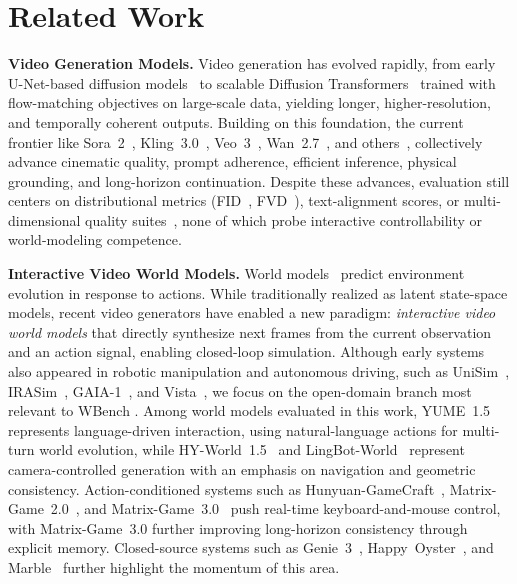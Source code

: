 \documentclass{llmxive}
\providecommand{\benchmark}{WBench }
\begin{document}
\section{Related Work}
\label{sec:related_work}

\textbf{Video Generation Models.}
Video generation has evolved rapidly, from early U-Net-based diffusion models~\cite{ho2020denoising,ho2022video,blattmann2023align} to scalable Diffusion Transformers~\cite{yang2024cogvideox,polyak2024moviegen,kong2024hunyuanvideo} trained with flow-matching objectives on large-scale data, yielding longer, higher-resolution, and temporally coherent outputs.
Building on this foundation, the current frontier like Sora~2~\cite{openai2025sora2}, Kling~3.0~\cite{kuaishou2025kling3}, Veo~3~\cite{deepmind2025veo3}, Wan~2.7~\cite{wan2025wan27}, and others~\cite{gao2026seedance2,shengshu2025viduq3,kong2024hunyuanvideo,lightricks2025ltx,nvidia2025cosmos,cai2025longcat}, collectively advance cinematic quality, prompt adherence, efficient inference, physical grounding, and long-horizon continuation.
Despite these advances, evaluation still centers on distributional metrics (FID~\cite{heusel2017fid}, FVD~\cite{unterthiner2019fvd}), text-alignment scores, or multi-dimensional quality suites~\cite{huang2024vbench}, none of which probe interactive controllability or world-modeling competence.


\textbf{Interactive Video World Models.}
World models~\cite{ha2018world,lecun2022path} predict environment evolution in response to actions. While traditionally realized as latent state-space models, recent video generators have enabled a new paradigm: \emph{interactive video world models} that directly synthesize next frames from the current observation and an action signal, enabling closed-loop simulation. Although early systems also appeared in robotic manipulation and autonomous driving, such as UniSim~\cite{yang2023unisim}, IRASim~\cite{zhu2024irasim}, GAIA-1~\cite{hu2023gaia1}, and Vista~\cite{gao2024vista}, we focus on the open-domain branch most relevant to \benchmark.
Among world models evaluated in this work, YUME~1.5~\cite{mao2025yume15} represents language-driven interaction, using natural-language actions for multi-turn world evolution, while HY-World~1.5~\cite{sun2025hyworldplay} and LingBot-World~\cite{gao2026lingbot} represent camera-controlled generation with an emphasis on navigation and geometric consistency.
Action-conditioned systems such as Hunyuan-GameCraft~\cite{li2025hunyuangamecraft,tang2025interbench}, Matrix-Game~2.0~\cite{he2025matrixgame2}, and Matrix-Game~3.0~\cite{he2026matrixgame3} push real-time keyboard-and-mouse control, with Matrix-Game~3.0 further improving long-horizon consistency through explicit memory. Closed-source systems such as Genie~3~\cite{ball2025genie3}, Happy~Oyster~\cite{alibaba2026happyoyster}, and Marble~\cite{worldlabs2025marble} further highlight the momentum of this area.
\end{document}
